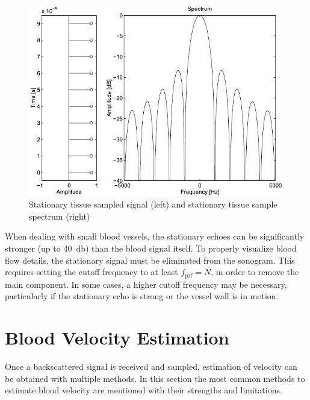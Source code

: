 \begin{figure}[htbp]
	\centering
	\includegraphics[width=.8\textwidth]{Figures/2_rf_spectrum_stationary.pdf}
	\caption[Stationary tissue sampled signal and stationary tissue sample spectrum]{Stationary tissue sampled signal (left) and stationary tissue sample spectrum (right) \cite{JensenUltrasoundBook}}
	\label{fig:2_rf_spectrum_stationary}
\end{figure}

When dealing with small blood vessels, the stationary echoes can be significantly stronger (up to \qty{40}{\decibel}) than the blood signal itself. To properly visualize blood flow details, the stationary signal must be eliminated from the sonogram. This requires setting the cutoff frequency to at least $f_{\mathrm{prf}} = N$, in order to remove the main component. In some cases, a higher cutoff frequency may be necessary, particularly if the stationary echo is strong or the vessel wall is in motion.

\section{Blood Velocity Estimation}
Once a backscattered signal is received and sampled, estimation of velocity can be obtained with multiple methods. In this section the most common methods to estimate blood velocity are mentioned with their strengths and limitations.
